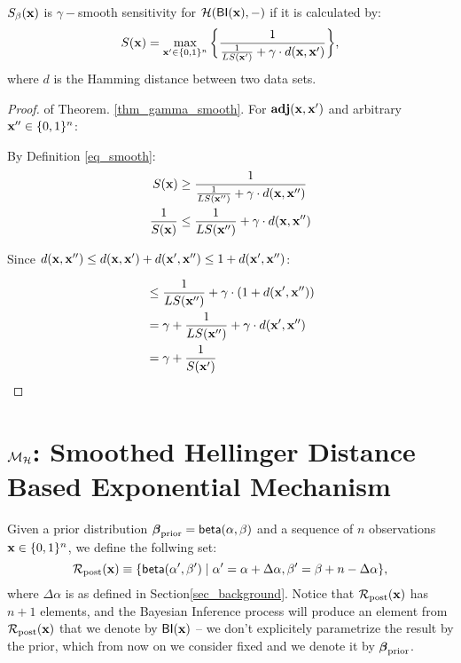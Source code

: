 \documentclass{article}
\begin{document}
\begin{thm}
\label{thm_gamma_smooth}
$S_\beta(\textbf{x})$ is $\gamma -$smooth sensitivity for $\mathcal{H}(\mathsf{BI}(\textbf{x}),-)$ if it is calculated by:
\begin{equation}
  \label{eq_smooth}
   S(\textbf{x})=\max_{\textbf{x}' \in \{0,1\}^{n}}\bigg \{ \frac{1}{\frac{1}{LS(\textbf{x}')} +\gamma \cdot d(\textbf{x},\textbf{x}')} \bigg \},
\end{equation}
where $d$ is the Hamming distance between two data sets.
\end{thm}

\begin{proof}
of Theorem. \ref{thm_gamma_smooth}.
For $\textbf{adj}(\textbf{x},\textbf{x}')$ and arbitrary $\textbf{x}'' \in \{0,1\}^{n}$:

By Definition \ref{eq_smooth}:
\begin{equation*}
\begin{split}
S(\textbf{x}) 
& \geq \frac{1}{\frac{1}{LS(\textbf{x}'')} +\gamma \cdot d(\textbf{x},\textbf{x}'')}\\
\frac{1}{S(\textbf{x})} 
& \leq \frac{1}{LS(\textbf{x}'')} +\gamma \cdot d(\textbf{x},\textbf{x}'')\\
\end{split}
\end{equation*}

Since $d(\textbf{x},\textbf{x}'') \leq d(\textbf{x},\textbf{x}') + d(\textbf{x}',\textbf{x}'') \leq 1 + d(\textbf{x}',\textbf{x}'')$:

\begin{equation*}
\begin{split}
& \leq \frac{1}{LS(\textbf{x}'')} +\gamma \cdot (1 + d(\textbf{x}',\textbf{x}''))\\
& = \gamma + \frac{1}{LS(\textbf{x}'')} +\gamma \cdot d(\textbf{x}',\textbf{x}'')\\
& = \gamma + \frac{1}{S(\textbf{x}')}
\end{split}
\end{equation*}


\end{proof}



\section{$\mathcal{M}_{\mathcal{H}}$: Smoothed Hellinger Distance Based Exponential Mechanism}
\label{sec_mechs}
Given a prior distribution $\boldsymbol{\beta}_{\textup{prior}} = \mathsf{beta}(\alpha, \beta)$ and a sequence of $n$ observations $\textbf{x}\in\{0,1\}^n$, we define the follwing set:
\[
  \mathcal{R}_{\textup{post}}(\textbf{x}) \equiv\{\mathsf{beta}(\alpha',\beta')\mid \alpha'=\alpha+\Delta\alpha, \beta'=\beta+n-\Delta\alpha\},
\]
where $\Delta\alpha$ is as defined in Section\ref{sec_background}.
Notice that $\mathcal{R}_{\textup{post}}(\textbf{x})$ has $n + 1$ elements, and
the Bayesian Inference process will produce an element from $\mathcal{R}_{\textup{post}}(\textbf{x})$
that we denote by $\mathsf{BI}(\textbf{x})$ -- we don't explicitely
parametrize the result by the prior, which from now on we consider
fixed and we denote it by $\boldsymbol{\beta}_{\textup{prior}}$.
\end{document}
